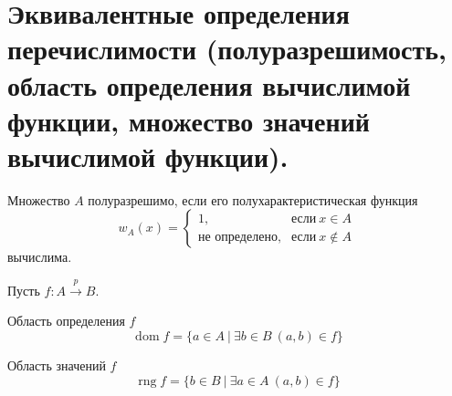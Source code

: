\section{Эквивалентные определения перечислимости (полуразрешимость, область определения вычислимой функции, множество значений вычислимой функции).}

\begin{definition}
  Множество $A$ полуразрешимо, если его полухарактеристическая функция
  \[
    w_A(x) = \begin{cases}
      1, & \textit{если} \> x \in A \\
      \textit{не определено}, & \textit{если} \> x \notin A
    \end{cases}
  \]
  вычислима.
\end{definition}

Пусть $f : A \overset{p}{\to} B$.

\begin{definition}
  Область определения $f$
  \[
    \operatorname{dom} f = \{a \in A \> | \> \exists b \in B \> (a,b) \in f\}
  \]
\end{definition}

\begin{definition}
  Область значений $f$
  \[
    \operatorname{rng} f = \{b \in B \> | \> \exists a \in A \> (a,b) \in f\} 
  \]
\end{definition}

